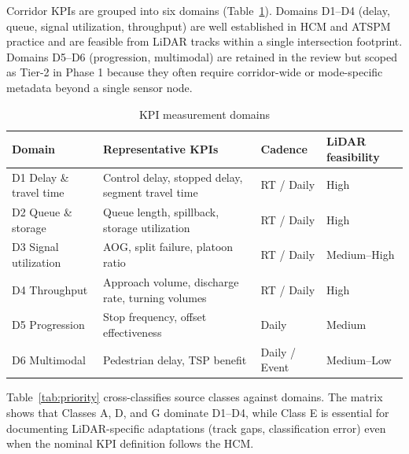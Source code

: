 \documentclass[11pt]{article}
\begin{document}
Corridor KPIs are grouped into six domains (Table~\ref{tab:domains}). Domains D1--D4 (delay, queue, signal utilization, throughput) are well established in HCM and ATSPM practice and are feasible from LiDAR tracks within a single intersection footprint. Domains D5--D6 (progression, multimodal) are retained in the review but scoped as Tier-2 in Phase 1 because they often require corridor-wide or mode-specific metadata beyond a single sensor node.

\begin{table}[htbp]
\centering
\caption{KPI measurement domains}
\label{tab:domains}
\small
\begin{tabularx}{\textwidth}{@{}p{}X p{}p{}@{}}
\toprule
Domain & Representative KPIs & Cadence & LiDAR feasibility \\
\midrule
D1 Delay \& travel time & Control delay, stopped delay, segment travel time & RT / Daily & High \\
D2 Queue \& storage & Queue length, spillback, storage utilization & RT / Daily & High \\
D3 Signal utilization & AOG, split failure, platoon ratio & RT / Daily & Medium--High \\
D4 Throughput & Approach volume, discharge rate, turning volumes & RT / Daily & High \\
D5 Progression & Stop frequency, offset effectiveness & Daily & Medium \\
D6 Multimodal & Pedestrian delay, TSP benefit & Daily / Event & Medium--Low \\
\bottomrule
\end{tabularx}
\end{table}

Table~\ref{tab:priority} cross-classifies source classes against domains. The matrix shows that Classes A, D, and G dominate D1--D4, while Class E is essential for documenting LiDAR-specific adaptations (track gaps, classification error) even when the nominal KPI definition follows the HCM.
\end{document}
